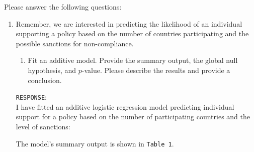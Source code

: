\documentclass[12pt,letterpaper]{article}
\begin{document}
\newpage
\noindent Please answer the following questions:

\begin{enumerate}
	\item
	Remember, we are interested in predicting the likelihood of an individual supporting a policy based on the number of countries participating and the possible sanctions for non-compliance.
	\begin{enumerate}
		\item [] Fit an additive model. Provide the summary output, the global null hypothesis, and $p$-value. Please describe the results and provide a conclusion.

	\end{enumerate}
	
\texttt{RESPONSE}:\\

I have fitted an additive logistic regression model predicting individual support for a policy based on the number of participating countries and the level of sanctions:

\vspace{0.2in}

\vspace{0.2in}

The model's summary output is shown in \texttt{Table 1}.


\end{enumerate}
\end{document}
